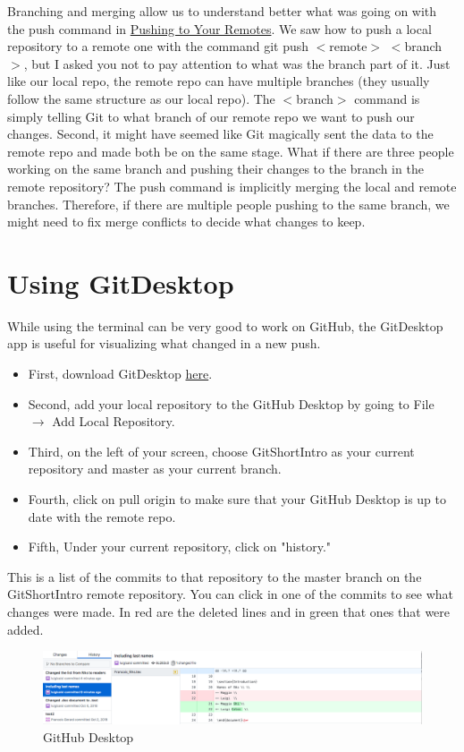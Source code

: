 \documentclass{article}
\begin{document}
    Branching and merging allow us to understand better what was going on with the push command in \hyperref[sec:pushing]{Pushing to Your Remotes}. We saw how to push a local repository to a remote one with the command git push $<$remote$>$ $<$branch$>$, but I asked you not to pay attention to what was the branch part of it. Just like our local repo, the remote repo can have multiple branches (they usually follow the same structure as our local repo). The $<$branch$>$ command is simply telling Git to what branch of our remote repo we want to push our changes. Second, it might have seemed like Git magically sent the data to the remote repo and made both be on the same stage. What if there are three people working on the same branch and pushing their changes to the branch in the remote repository? The push command is implicitly merging the local and remote branches. Therefore, if there are multiple people pushing to the same branch, we might need to fix merge conflicts to decide what changes to keep.
    \section{Using GitDesktop}
    \label{sec:GitDesktop}
    While using the terminal can be very good to work on GitHub, the GitDesktop app is useful for visualizing what changed in a new push. 
    \begin{itemize}
        \item First, download GitDesktop  \href{https://desktop.github.com/}{here}.
        \item Second, add your local repository to the GitHub Desktop by going to File $\rightarrow$ Add Local Repository.
        \item Third, on the left of your screen, choose GitShortIntro as your current repository and master as your current branch.
        \item Fourth, click on pull origin to make sure that your GitHub Desktop is up to date with the remote repo.
        \item Fifth, Under your current repository, click on "history."
    \end{itemize}
    This is a list of the commits to that repository to the master branch on the GitShortIntro remote repository. You can click in one of the commits to see what changes were made. In red are the deleted lines and in green that ones that were added. 
    \begin{figure}[H]
    	\caption{GitHub Desktop}
    	\includegraphics[scale=0.5]{images/figure13.png}
    	\centering
    \end{figure} 
    
\end{document}
